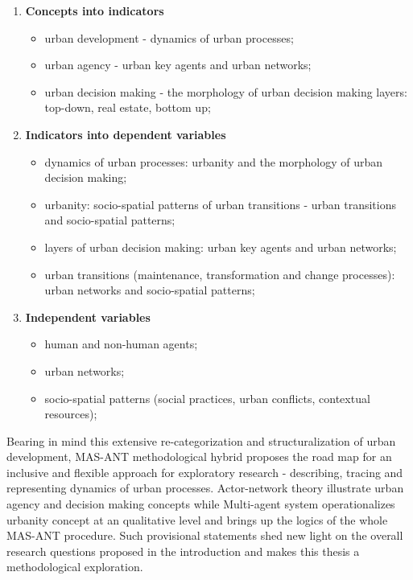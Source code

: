 \documentclass[11pt]{report}
\begin{document}
\begin{enumerate}
\item \textbf{Concepts into indicators}
\begin{itemize}
\item urban development - dynamics of urban processes;
\item urban agency - urban key agents and urban networks;
\item urban decision making - the morphology of urban decision making layers: top-down, real estate, bottom up;
\end{itemize}
\item \textbf{Indicators into dependent variables}
\begin{itemize}
\item dynamics of urban processes: urbanity and the morphology of urban decision making;
\item urbanity: socio-spatial patterns of urban transitions - urban transitions and socio-spatial patterns;
\item layers of urban decision making: urban key agents and urban networks;
\item urban transitions (maintenance, transformation and change processes): urban networks and socio-spatial patterns;
\end{itemize}
\item \textbf{Independent variables}
\begin{itemize}
\item human and non-human agents;
\item urban networks;
\item socio-spatial patterns (social practices, urban conflicts, contextual resources);
\end{itemize}
\end{enumerate}

Bearing in mind this extensive re-categorization and structuralization of urban development, MAS-ANT methodological hybrid proposes the road map for an inclusive and flexible approach for exploratory research - describing, tracing and representing dynamics of urban processes. Actor-network theory illustrate urban agency and decision making concepts while Multi-agent system operationalizes urbanity concept at an qualitative level and brings up the logics of the whole MAS-ANT procedure. Such provisional statements shed new light on the overall research questions proposed in the introduction and makes this thesis a methodological exploration.
\end{document}
